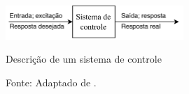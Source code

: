 \begin{figure}[h]
 \centering
 \captionsetup{width=0.6\textwidth,font=footnotesize,textfont=bf}
 \includegraphics[width=0.6\textwidth]{figuras/DiagramaNise.png}
 \caption{Descrição de um sistema de controle \label{fig:basicdiag}}
  \vspace{-0.3cm}
 \caption*{Fonte: Adaptado de \cite[p.2]{nise}.}
\end{figure}

